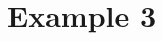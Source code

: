 \documentclass[8pt, xcolor={svgnames, x11names}]{beamer}
\def\scale{1}
\begin{document}


\section{Example 3} %
% 


%       
%       


\end{document}
